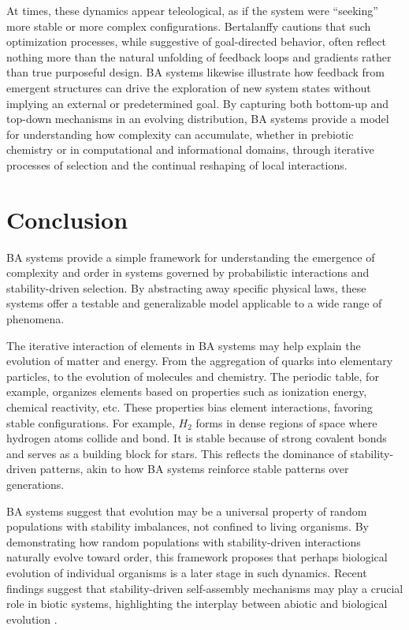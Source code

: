 \documentclass[entropy,article,submit,pdftex,moreauthors]{Definitions/mdpi}
\begin{document}
At times, these dynamics appear teleological, as if the system were ``seeking'' more stable or more complex configurations. Bertalanffy \cite{bertalanffy1968general} cautions that such optimization processes, while suggestive of goal-directed behavior, often reflect nothing more than the natural unfolding of feedback loops and gradients rather than true purposeful design. BA systems likewise illustrate how feedback from emergent structures can drive the exploration of new system states without implying an external or predetermined goal. By capturing both bottom-up and top-down mechanisms in an evolving distribution, BA systems provide a model for understanding how complexity can accumulate, whether in prebiotic chemistry or in computational and informational domains, through iterative processes of selection and the continual reshaping of local interactions.


\section{Conclusion}

BA systems provide a simple framework for understanding the emergence of complexity and order in systems governed by probabilistic interactions and stability-driven selection. By abstracting away specific physical laws, these systems offer a testable and generalizable model applicable to a wide range of phenomena. 

The iterative interaction of elements in BA systems may help explain the evolution of matter and energy. From the aggregation of quarks into elementary particles, to the evolution of molecules and chemistry. The periodic table, for example, organizes elements based on properties such as ionization energy, chemical reactivity, etc. These properties bias element interactions, favoring stable configurations. For example, \( H_2 \) forms in dense regions of space where hydrogen atoms collide and bond. It is stable because of strong covalent bonds and serves as a building block for stars. This reflects the dominance of stability-driven patterns, akin to how BA systems reinforce stable patterns over generations. 

BA systems suggest that evolution may be a universal property of random populations with stability imbalances, not confined to living organisms. By demonstrating how random populations with stability-driven interactions naturally evolve toward order, this framework proposes that perhaps biological evolution of individual organisms is a later stage in such dynamics. Recent findings suggest that stability-driven self-assembly mechanisms may play a crucial role in biotic systems, highlighting the interplay between abiotic and biological evolution \cite{davies2022selfassembly}.
\end{document}
